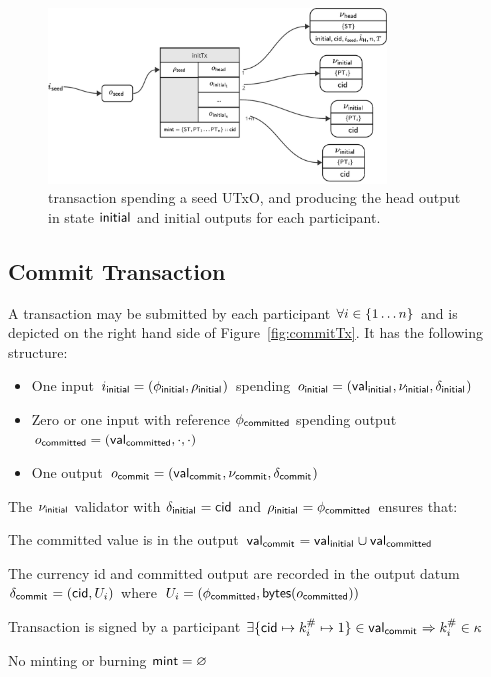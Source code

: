 \begin{figure}
	\centering
	\includegraphics[width=0.8\textwidth]{figures/initTx.pdf}
	\caption{\mtxInit{} transaction spending a seed UTxO, and producing the head
		output in state $\mathsf{initial}$ and initial outputs for each participant.}\label{fig:initTx}
\end{figure}

\subsection{Commit Transaction}\label{sec:commit-tx}

A \mtxCom{} transaction may be submitted by each participant
$\forall i \in \{1 \dots n\}$ and is depicted on the right hand side of
Figure~\ref{fig:commitTx}. It has the following structure:
\begin{itemize}
	\item One input $i_{\mathsf{initial}} = (\phi_{\mathsf{initial}}, \rho_{\mathsf{initial}_{}})$
	      spending $o_{\mathsf{initial}} = (\mathsf{val}_{\mathsf{initial}_{}}, \nu_{\mathsf{initial}}, \delta_{\mathsf{initial}_{}})$
	\item Zero or one input with reference
	      $\phi_{\mathsf{committed}}$ spending output
	      $o_{\mathsf{committed}} = (\mathsf{val}_{\mathsf{committed}}, \cdot , \cdot)$
	\item One output $o_{\mathsf{commit}} = (\mathsf{val}_{\mathsf{commit}_{}}, \nu_{\mathsf{commit}}, \delta_{\mathsf{commit}_{}})$
\end{itemize}

\noindent The $\nu_{\mathsf{initial}}$ validator with $\delta_{\mathsf{initial}_{}} = \mathsf{cid}$ and $\rho_{\mathsf{initial}_{}} = \phi_{\mathsf{committed}}$ ensures that:
\begin{menumerate}
	\item The committed value is in the output $\mathsf{val}_{\mathsf{commit}_{}} = \mathsf{val}_{\mathsf{initial}_{}} \cup \mathsf{val}_{\mathsf{committed}}$
	\item The currency id and committed output are recorded in the output datum
	$\delta_{\mathsf{commit}_{}} = (\mathsf{cid}, U_{i})$ where
	$U_{i} = (\phi_{\mathsf{committed}},\mathsf{bytes}(o_{\mathsf{committed}}))$
	\item Transaction is signed by a participant $\exists \{\mathsf{cid} \mapsto k^{\#}_{i} \mapsto 1\} \in \mathsf{val}_{\mathsf{commit}_{}} \Rightarrow k^{\#}_{i} \in \kappa$
	\item No minting or burning  $\mathsf{mint} = \varnothing$
\end{menumerate}

